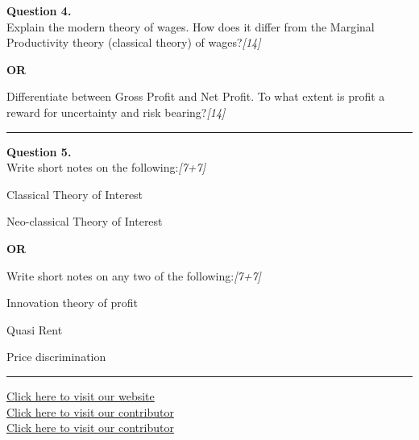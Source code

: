 \documentclass[11pt,a4paper]{article}
\newcommand{\pts}[1]{\hfill   \textit{[#1]}}
\begin{document}
\noindent   \textbf{Question 4.} \\
Explain the modern theory of wages. How does it differ from the Marginal Productivity theory (classical theory) of wages?\pts{14}

\centerline{   \textbf{OR}}

Differentiate between Gross Profit and Net Profit. To what extent is profit a reward for uncertainty and risk bearing?\pts{14}

\medskip\rule{\linewidth}{0.2pt}




\noindent   \textbf{Question 5.} \\
Write short notes on the following:\pts{7+7}

\begin{parts}
  \item Classical Theory of Interest
  \item Neo-classical Theory of Interest
\end{parts}

\centerline{   \textbf{OR}}

Write short notes on any two of the following:\pts{7+7}

\begin{parts}
  \item Innovation theory of profit
  \item Quasi Rent
  \item Price discrimination
\end{parts}

\vfill
\rule{\linewidth}{0.4pt}

\begin{center}\small
  \href{https://bhu-exam.vercel.app/}{Click here to visit our website}\\[4pt]
  \href{https://me-aryan.vercel.app/}{Click here to visit our contributor}\\[4pt]
  \href{https://quashan-me.vercel.app/}{Click here to visit our contributor}
\end{center}
\end{document}

